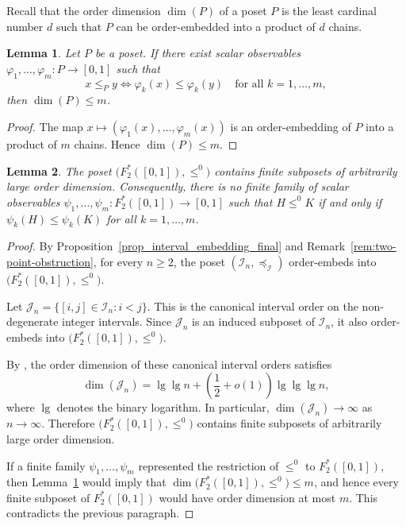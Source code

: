 \documentclass[11pt,a4paper]{article}
\newtheorem{lemma}{Lemma}
\begin{document}
Recall that the order dimension \(\dim(P)\) of a poset \(P\) is the least cardinal number \(d\) such that \(P\) can be order-embedded into a product of \(d\) chains.

\begin{lemma}\label{lema_finite_scores}
Let \(P\) be a poset. If there exist scalar observables \(\varphi_1,\dots,\varphi_m:P\to[0,1]\) such that
\[
x\le_P y
\Longleftrightarrow
\varphi_k(x)\le \varphi_k(y)
\quad\text{for all }k=1,\dots,m,
\]
then \(\dim(P)\le m\).
\end{lemma}

\begin{proof}
The map
\(
x\mapsto(\varphi_1(x),\dots,\varphi_m(x))
\)
is an order-embedding of \(P\) into a product of \(m\) chains. Hence \(\dim(P)\le m\).
\end{proof}




\begin{lemma}\label{cor_two_point_no_finite_representation}
The poset \(\bigl(F^*_2([0,1]),\leq^0\bigr)\) contains finite subposets of arbitrarily large order dimension. Consequently, there is no finite family of scalar observables \(\psi_1,\dots,\psi_m:F^*_2([0,1])\to[0,1]\) such that \(H\leq^0 K\) if and only if \(\psi_k(H)\leq\psi_k(K)\) for all \(k=1,\dots,m\).
\end{lemma}

\begin{proof}
By Proposition~\ref{prop_interval_embedding_final} and Remark~\ref{rem:two-point-obstruction}, for every \(n\ge 2\), the poset \((\mathcal I_n,\preceq_{\mathcal I})\) order-embeds into \(\bigl(F^*_2([0,1]),\leq^0\bigr)\).

Let \(\mathcal J_n=\{[i,j]\in\mathcal I_n: i<j\}\). This is the canonical interval order on the non-degenerate integer intervals. Since \(\mathcal J_n\) is an induced subposet of \(\mathcal I_n\), it also order-embeds into \(\bigl(F^*_2([0,1]),\leq^0\bigr)\).

By \citet[Corollary~5.2]{FurediHajnalRodlTrotter1992}, the order dimension of these canonical interval orders satisfies
\[
\dim(\mathcal J_n)
=
\lg\lg n
+
\left(\frac{1}{2}+o(1)\right)\lg\lg\lg n,
\]
where \(\lg\) denotes the binary logarithm. In particular, \(\dim(\mathcal J_n)\to\infty\) as \(n\to\infty\). Therefore \(\bigl(F^*_2([0,1]),\leq^0\bigr)\) contains finite subposets of arbitrarily large order dimension.

If a finite family \(\psi_1,\dots,\psi_m\) represented the restriction of \(\leq^0\) to \(F^*_2([0,1])\), then Lemma~\ref{lema_finite_scores} would imply that \(\dim\bigl(F^*_2([0,1]),\leq^0\bigr)\leq m\), and hence every finite subposet of \(F^*_2([0,1])\) would have order dimension at most \(m\). This contradicts the previous paragraph.
\end{proof}
\end{document}
